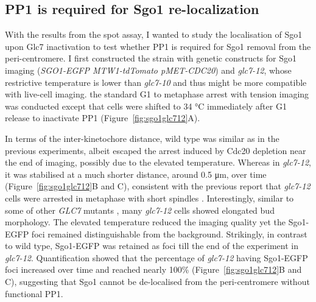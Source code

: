 
\subsection{PP1 is required for Sgo1 re-localization}

With the results from the spot assay, I wanted to study the localisation of Sgo1 upon Glc7 inactivation to test whether PP1 is required for Sgo1 removal from the peri-centromere. I first constructed the strain with genetic constructs for Sgo1 imaging (\textit{SGO1-EGFP MTW1-tdTomato pMET-CDC20}) and \textit{glc7-12}, whose restrictive temperature is lower than \textit{glc7-10} and thus might be more compatible with live-cell imaging. the standard G1 to metaphase arrest with tension imaging was conducted except that cells were shifted to 34 \si{\celsius} immediately after G1 release to inactivate PP1 (Figure~\ref{fig:sgo1glc712}A). 

In terms of the inter-kinetochore distance, wild type was similar as in the previous experiments, albeit escaped the arrest induced by Cdc20 depletion near the end of imaging, possibly due to the elevated temperature. Whereas in \textit{glc7-12}, it was stabilised at a much shorter distance, around 0.5 \si{\micro\metre}, over time (Figure~\ref{fig:sgo1glc712}B and C), consistent with the previous report that \textit{glc7-12} cells were arrested in metaphase with short spindles \citep{MacKelvie1995ThePhosphatase}. Interestingly, similar to some of other \textit{GLC7} mutants \citep{Black1995A1, Andrews2000TypeCerevisiae}, many \textit{glc7-12} cells showed elongated bud morphology. The elevated temperature reduced the imaging quality yet the Sgo1-EGFP foci remained distinguishable from the background. Strikingly, in contrast to wild type, Sgo1-EGFP was retained as foci till the end of the experiment in \textit{glc7-12}. Quantification showed that the percentage of \textit{glc7-12} having Sgo1-EGFP foci increased over time and reached nearly 100\% (Figure~\ref{fig:sgo1glc712}B and C), suggesting that Sgo1 cannot be de-localised from the peri-centromere without functional PP1. 

